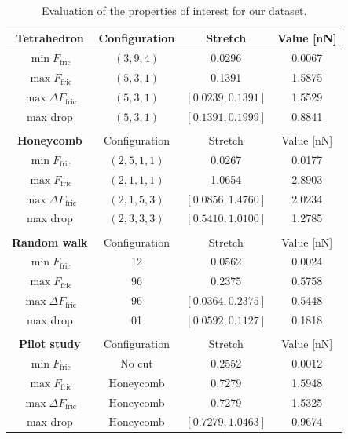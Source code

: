 \begin{table}[H]
  \begin{center}
  \caption{Evaluation of the properties of interest for our dataset.}
  \label{tab:data_properties}
  \begin{tabular}{| c | c | c | c|} \hline
  \textbf{Tetrahedron} & Configuration & Stretch & Value [nN]  \\ \hline
  $\min F_{\text{fric}}$ & $(3,9,4)$ &  0.0296 & 0.0067 \\ \hline
  $\max F_{\text{fric}}$ & $(5,3,1)$ & 0.1391 & 1.5875 \\ \hline
  $\max \Delta F_{\text{fric}}$  & $(5, 3, 1)$ & $[0.0239, 0.1391]$ & 1.5529 \\ \hline
  max drop & $(5,3,1)$ & $[0.1391, 0.1999]$ & 0.8841 \\ \hline
  \multicolumn{4}{c}{} \\ \hline
  \textbf{Honeycomb} & Configuration & Stretch & Value [nN]  \\ \hline
  $\min F_{\text{fric}}$ & $(2, 5, 1, 1)$ &  0.0267 & 0.0177 \\ \hline
  $\max F_{\text{fric}}$ & $(2, 1, 1, 1)$ & 1.0654 & 2.8903 \\ \hline
  $\max \Delta F_{\text{fric}}$  & $(2, 1, 5, 3)$ & $[0.0856, 1.4760]$ & 2.0234 \\ \hline
  max drop & $(2, 3, 3, 3)$ & $[0.5410, 1.0100]$ & 1.2785 \\ \hline
  \multicolumn{4}{c}{} \\ \hline
  \textbf{Random walk} & Configuration & Stretch & Value [nN]  \\ \hline
  $\min F_{\text{fric}}$ & 12 &  0.0562 & 0.0024\\ \hline
  $\max F_{\text{fric}}$ & 96 & 0.2375 & 0.5758 \\ \hline
  $\max \Delta F_{\text{fric}}$  & 96 & $[0.0364, 0.2375]$ & 0.5448 \\ \hline
  max drop & 01 & $[0.0592, 0.1127]$ & 0.1818 \\ \hline
  \multicolumn{4}{c}{} \\ \hline
  \textbf{Pilot study} & Configuration & Stretch & Value [nN]  \\ \hline
  $\min F_{\text{fric}}$ & No cut & 0.2552 & 0.0012 \\ \hline
  $\max F_{\text{fric}}$ & Honeycomb & 0.7279 & 1.5948 \\ \hline
  $\max \Delta F_{\text{fric}}$  & Honeycomb & 0.7279 & 1.5325 \\ \hline
  max drop & Honeycomb & $[0.7279, 1.0463]$ & 0.9674 \\ \hline
\end{tabular}
\end{center}
\end{table}



